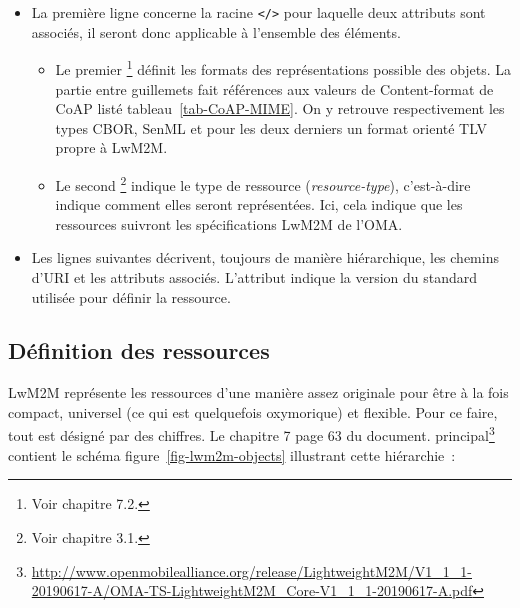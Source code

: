 \begin{itemize}
    \item La première ligne concerne la racine \texttt{</>} pour laquelle deux attributs sont associés, il seront donc applicable à l'ensemble des éléments. 
    \begin{itemize}
        \item  Le premier \texttt{}\footnote{Voir  chapitre 7.2.} définit les formats des représentations possible des objets. La partie entre guillemets fait références aux valeurs de Content-format de CoAP listé tableau~\vref{tab-CoAP-MIME}. On y retrouve respectivement les types CBOR, SenML et pour les deux derniers un format orienté TLV propre à LwM2M.
        \item Le second \texttt{}\footnote{Voir  chapitre 3.1.} indique le type de ressource (\textit{resource-type}), c'est-à-dire indique comment elles seront représentées. Ici, cela indique que les ressources suivront les spécifications \ac{LwM2M} de l'\ac{OMA}.
    \end{itemize}
    \item Les lignes suivantes décrivent, toujours de manière hiérarchique, les chemins d'URI et les attributs associés. L'attribut \texttt{} indique la version du standard utilisée pour définir la ressource.
 
\end{itemize}



\subsection{Définition des ressources}

LwM2M représente les ressources d'une manière assez originale pour être à la fois compact, universel (ce qui est quelquefois oxymorique) et flexible. Pour ce faire, tout est désigné par des chiffres.  Le chapitre 7 page 63 du document. principal\footnote{\url{http://www.openmobilealliance.org/release/LightweightM2M/V1_1_1-20190617-A/OMA-TS-LightweightM2M_Core-V1_1_1-20190617-A.pdf}} contient le schéma figure~\vref{fig-lwm2m-objects}  illustrant cette hiérarchie~:  


